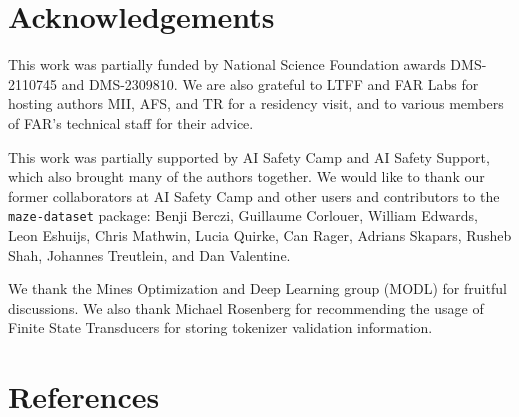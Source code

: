 \documentclass[10pt,a4paper,onecolumn]{article}
\begin{document}
\hypertarget{acknowledgements}{%
\section{Acknowledgements}\label{acknowledgements}}

This work was partially funded by National Science Foundation awards
DMS-2110745 and DMS-2309810. We are also grateful to LTFF and FAR Labs
for hosting authors MII, AFS, and TR for a residency visit, and to
various members of FAR's technical staff for their advice.

This work was partially supported by AI Safety Camp and AI Safety
Support, which also brought many of the authors together. We would like
to thank our former collaborators at AI Safety Camp and other users and
contributors to the \texttt{maze-dataset} package: Benji Berczi,
Guillaume Corlouer, William Edwards, Leon Eshuijs, Chris Mathwin, Lucia
Quirke, Can Rager, Adrians Skapars, Rusheb Shah, Johannes Treutlein, and
Dan Valentine.

We thank the Mines Optimization and Deep Learning group (MODL) for
fruitful discussions. We also thank Michael Rosenberg for recommending
the usage of Finite State Transducers for storing tokenizer validation
information.

\newpage

\hypertarget{references}{%
\section*{References}\label{references}}
\end{document}
